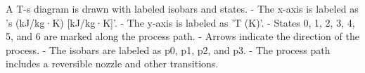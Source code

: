 A T-s diagram is drawn with labeled isobars and states.  
- The x-axis is labeled as 's (kJ/kg·K) [kJ/kg·K]'.  
- The y-axis is labeled as 'T (K)'.  
- States 0, 1, 2, 3, 4, 5, and 6 are marked along the process path.  
- Arrows indicate the direction of the process.  
- The isobars are labeled as p0, p1, p2, and p3.  
- The process path includes a reversible nozzle and other transitions.